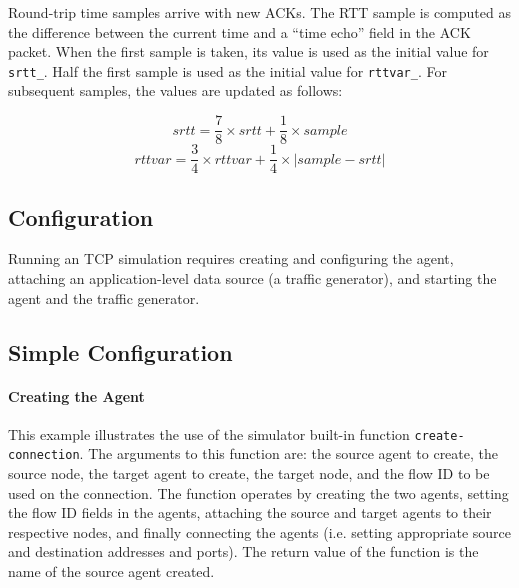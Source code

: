 Round-trip time samples arrive with new ACKs.
The RTT sample is computed as the difference between the current
time and a ``time echo'' field in the ACK packet.
When the first sample is taken, its value is used as the initial
value for {\tt srtt\_}.  Half the first sample is used as the initial
value for {\tt rttvar\_}.
For subsequent samples, the values are updated as follows:

\[ srtt = \frac{7}{8} \times srtt + \frac{1}{8} \times sample \]
\[ rttvar = \frac{3}{4} \times rttvar + \frac{1}{4} \times |sample-srtt| \]

\subsection{Configuration}
\label{sec:tcp-config}

Running an TCP simulation requires
creating and configuring the agent,
attaching an application-level data source (a traffic generator), and
starting the agent and the traffic generator.

\subsection{Simple Configuration}

\paragraph{Creating the Agent}
This example illustrates the use of the simulator built-in
function {\tt create-connection}.
The arguments to this function are: the source agent to create,
the source node, the target agent to create, the target node, and
the flow ID to be used on the connection.
The function operates by creating the two agents, setting the
flow ID fields in the agents, attaching the source and target agents
to their respective nodes, and finally connecting the agents
(i.e. setting appropriate source and destination addresses and ports).
The return value of the function is the name of the source agent created.

